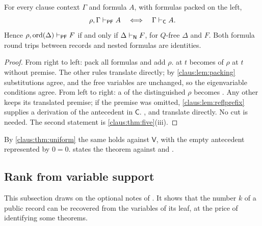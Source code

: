 \begin{theorem}
\label{claus:thm:prefix}
For every clause context $\Gamma$ and formula $A$, with formulas packed on
the left,
\[
 \rho,\Gamma\vdash_{\mathsf{PF}}A\quad\Longleftrightarrow\quad
 \Gamma\vdash_{\mathsf{C}}A .
\]
Hence $\rho,\operatorname{ord}(\Delta)\vdash_{\mathsf{PF}}F$ if and only
if $\Delta\vdash_{\mathsf{N}}F$, for $Q$-free $\Delta$ and $F$. Both formula
round trips between records and nested formulas are identities.
\end{theorem}
\begin{proof}
From right to left: pack all formulas and add $\rho$.  at
$t$ becomes  of $\rho$ at $t$ without premise. The other
rules translate directly; by \cref{claus:lem:packing} substitutions agree,
and the free variables are unchanged, so the eigenvariable conditions
agree. From left to right: a  of the distinguished $\rho$
becomes . Any other  keeps its translated
premise; if the premise was omitted, \cref{claus:lem:reflprefix} supplies
a derivation of the antecedent in $\mathsf{C}$. ,
 and  translate directly. No cut is needed.
The second statement is \cref{claus:thm:five}(iii).
\end{proof}

By \cref{claus:thm:uniform} the same holds against $\mathsf{V}$, with the
empty antecedent represented by $0=0$.  states the
theorem against  and .

\subsection{Rank from variable support}
\label{claus:sec:support}

This subsection draws on the optional notes of . It
shows that the number $k$ of a public record can be recovered from the
variables of its leaf, at the price of identifying some theorems.

